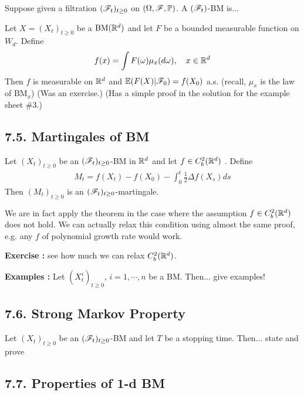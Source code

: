 \documentclass[10pt,a4paper]{report}
\begin{document}
Suppose given a filtration $(\mathscr{F}_t)_{t\geq 0}$ on $(\Omega, \mathscr{F}, \mathbb{P})$. A $(\mathscr{F}_t)$-BM is...
\s

 Let $X = (X_t)_{t\geq 0}$ be a $\text{BM}(\mathbb{R}^d)$ and let $F$ be a bounded measurable function on $W_d$. Define
\begin{align*}
f(x) = \int F(\omega) \mu_x (d\omega), \quad x\in \mathbb{R}^d
\end{align*}
Then $f$ is measurable on $\mathbb{R}^d$ and $\mathbb{E}(F(X) |\mathscr{F}_0)  = f(X_0)$ a.s. (recall, $\mu_x$ is the law of $\text{BM}_x$)
(Was an exercise.) (Has a simple proof in the solution for the example sheet {\#}3.)
\s

\subsection*{7.5. Martingales of BM}

 Let $(X_t)_{t\geq 0}$ be an $(\mathscr{F}_t)_{t\geq 0}$-BM in $\mathbb{R}^d$ and let $f\in C_b^2(\mathbb{R}^d)$ . Define
\begin{align*}
M_t = f(X_t) - f(X_0) - \int_0^t \frac{1}{2} \Delta f(X_s) ds
\end{align*}
Then $(M_t)_{t\geq 0}$ is an $(\mathscr{F}_t)_{t\geq 0}$-martingale.
\s

We are in fact apply the theorem in the case where the assumption $f \in C_b^2(\mathbb{R}^d)$ does not hold. We can actually relax this condition using almost the same proof, e.g. any $f$ of polynomial growth rate would work.
\s

\textbf{Exercise :} see how much we can relax $C_b^2(\mathbb{R}^d)$.

\textbf{Examples : } Let $(X_t^i)_{t\geq 0}$, $i=1, \cdots, n$ be a BM. Then... give examples!

\subsection*{7.6. Strong Markov Property}

 Let $(X_t)_{t\geq 0}$ be an $(\mathscr{F}_t)_{t\geq 0}$-BM and let $T$ be a stopping time. Then... state and prove

\subsection*{7.7. Properties of 1-d BM}
\end{document}
